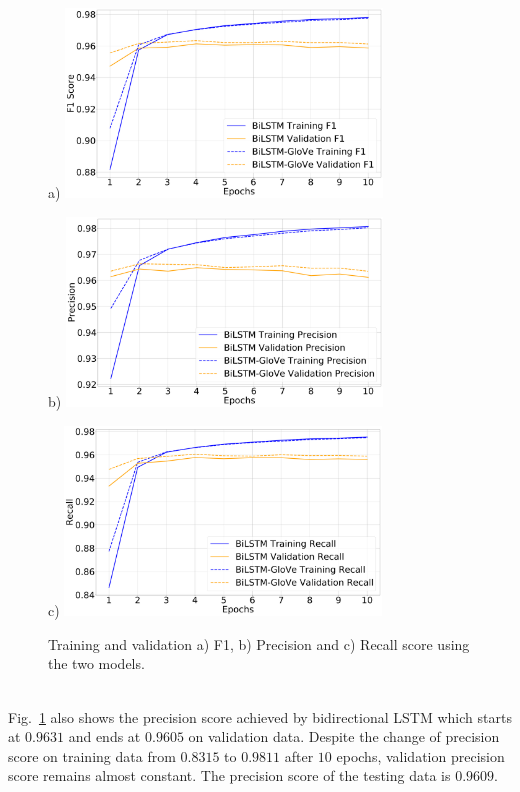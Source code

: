 \documentclass[sigconf, nonacm, natbib, screen, balance=False]{acmart}
\begin{document}
\begin{figure}
  \centering
  \begin{subfig}{a)}
  \includegraphics[width=84mm, frame]{../figures/Training_F1.pdf}
  \end{subfig}
  \begin{subfig}{b)}
  \includegraphics[width=84mm, frame]{../figures/Training_Precision.pdf}
  \end{subfig}
  \begin{subfig}{c)}
  \includegraphics[width=84mm, frame]{../figures/Training_Recall.pdf}
  \end{subfig}
  \caption{Training and validation a) F1, b) Precision and c) Recall score using the two models.}
  \label{fig:f1_bilstm}
\end{figure}
\hfill\\
Fig.~\ref{fig:f1_bilstm} also shows the precision score achieved by bidirectional LSTM which starts at $0.9631$ and ends at $0.9605$ on validation data. Despite the change of precision score on training data from $0.8315$ to $0.9811$ after $10$ epochs, validation precision score remains almost constant. The precision score of the testing data is $0.9609$.    
\end{document}
